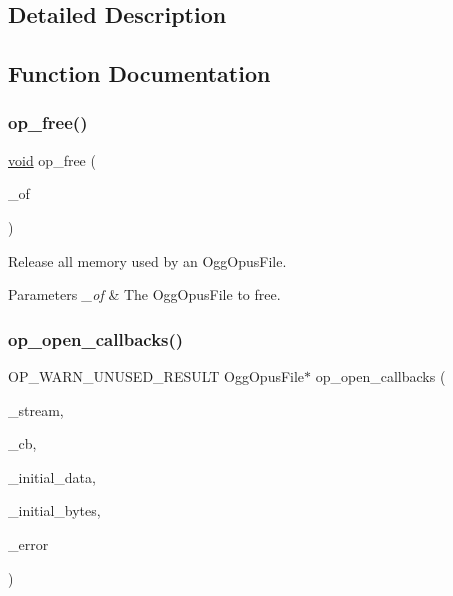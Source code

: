 \subsection{Detailed Description}


\subsection{Function Documentation}
\mbox{\label{group__stream__open__close_gaf494ef9aa761647d8167c49507560d1c}} 
\subsubsection{\texorpdfstring{op\_free()}{op\_free()}}
{\footnotesize\ttfamily \mbox{\hyperlink{_s_d_l__opengles2__gl2ext_8h_ae5d8fa23ad07c48bb609509eae494c95}{void}} op\+\_\+free (\begin{DoxyParamCaption}\item[{Ogg\+Opus\+File $\ast$}]{\+\_\+of }\end{DoxyParamCaption})}

Release all memory used by an {\ttfamily Ogg\+Opus\+File}. 
\begin{DoxyParams}{Parameters}
{\em \+\_\+of} & The {\ttfamily Ogg\+Opus\+File} to free. \\
\hline
\end{DoxyParams}
\mbox{\label{group__stream__open__close_gad183ecf5fbec5add3a5ccf1e3b1d2593}} 
\subsubsection{\texorpdfstring{op\_open\_callbacks()}{op\_open\_callbacks()}}
{\footnotesize\ttfamily O\+P\+\_\+\+W\+A\+R\+N\+\_\+\+U\+N\+U\+S\+E\+D\+\_\+\+R\+E\+S\+U\+LT Ogg\+Opus\+File$\ast$ op\+\_\+open\+\_\+callbacks (\begin{DoxyParamCaption}\item[{\mbox{\hyperlink{_s_d_l__opengles2__gl2ext_8h_ae5d8fa23ad07c48bb609509eae494c95}{void}} $\ast$}]{\+\_\+stream,  }\item[{const \mbox{\hyperlink{struct_opus_file_callbacks}{Opus\+File\+Callbacks}} $\ast$}]{\+\_\+cb,  }\item[{const unsigned char $\ast$}]{\+\_\+initial\+\_\+data,  }\item[{size\+\_\+t}]{\+\_\+initial\+\_\+bytes,  }\item[{int $\ast$}]{\+\_\+error }\end{DoxyParamCaption})}


